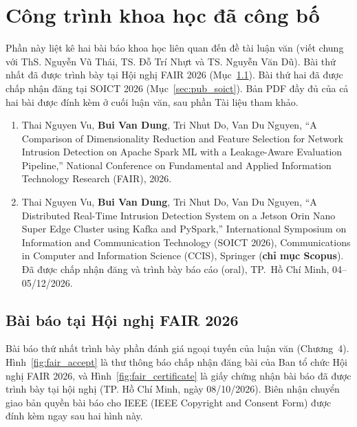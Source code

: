 \chapter[\texorpdfstring{\MakeUppercase{Công trình khoa học đã công bố}}{Công trình khoa học đã công bố}]{Công trình khoa học đã công bố}
Phần này liệt kê hai bài báo khoa học liên quan đến đề tài luận văn (viết chung với ThS. Nguyễn Vũ Thái, TS. Đỗ Trí Nhựt và TS. Nguyễn Văn Dũ). Bài thứ nhất đã được trình bày tại Hội nghị FAIR 2026 (Mục~\ref{sec:pub_fair}). Bài thứ hai đã được chấp nhận đăng tại SOICT 2026 (Mục~\ref{sec:pub_soict}). Bản PDF đầy đủ của cả hai bài được đính kèm ở cuối luận văn, sau phần Tài liệu tham khảo.

\begin{enumerate}
  \item Thai Nguyen Vu, \textbf{Bui Van Dung}, Tri Nhut Do, Van Du Nguyen, ``A Comparison of Dimensionality Reduction and Feature Selection for Network Intrusion Detection on Apache Spark ML with a Leakage-Aware Evaluation Pipeline,'' National Conference on Fundamental and Applied Information Technology Research (FAIR), 2026.
  \item Thai Nguyen Vu, \textbf{Bui Van Dung}, Tri Nhut Do, Van Du Nguyen, ``A Distributed Real-Time Intrusion Detection System on a Jetson Orin Nano Super Edge Cluster using Kafka and PySpark,'' International Symposium on Information and Communication Technology (SOICT 2026), Communications in Computer and Information Science (CCIS), Springer (\textbf{chỉ mục Scopus}). Đã được chấp nhận đăng và trình bày báo cáo (oral), TP.~Hồ Chí Minh, 04--05/12/2026.
\end{enumerate}

\section{Bài báo tại Hội nghị FAIR 2026}
\label{sec:pub_fair}
Bài báo thứ nhất trình bày phần đánh giá ngoại tuyến của luận văn (Chương~4). Hình~\ref{fig:fair_accept} là thư thông báo chấp nhận đăng bài của Ban tổ chức Hội nghị FAIR 2026, và Hình~\ref{fig:fair_certificate} là giấy chứng nhận bài báo đã được trình bày tại hội nghị (TP. Hồ Chí Minh, ngày 08/10/2026). Biên nhận chuyển giao bản quyền bài báo cho IEEE (IEEE Copyright and Consent Form) được đính kèm ngay sau hai hình này.

